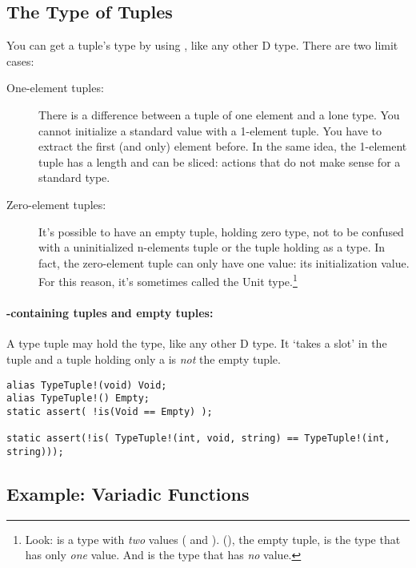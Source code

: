 \subsection{The Type of Tuples}\label{typeoftuples}

You can get a tuple's type by using , like any other D type. There are two limit cases:

\begin{description}
\item[One-element tuples:] There is a difference between a tuple of one element and a lone type. You cannot initialize a standard value with a 1-element tuple. You have to extract the first (and only) element before. In the same idea, the 1-element tuple has a length and can be sliced: actions that do not make sense for a standard type.
\item[Zero-element tuples:] It's possible to have an empty tuple, holding zero type, not to be confused with a uninitialized n-elements tuple or the tuple holding  as a type. In fact, the zero-element tuple can only have one value: its initialization value. For this reason, it's sometimes called the Unit type.\footnote{ Look:  is a type with \emph{two} values ( and ). (), the empty tuple, is the type that has only \emph{one} value. And  is the type that has \emph{no} value.}
\end{description}

\paragraph{-containing tuples and empty tuples: } A type tuple may hold the  type, like any other D type. It `takes a slot' in the tuple and a tuple holding only a  is \emph{not} the empty tuple.

\begin{verbatim}
alias TypeTuple!(void) Void;
alias TypeTuple!() Empty;
static assert( !is(Void == Empty) );

static assert(!is( TypeTuple!(int, void, string) == TypeTuple!(int, string)));
\end{verbatim}

\subsection{Example: Variadic Functions}\label{variadicfunctions}

